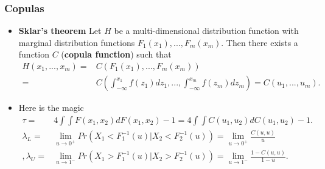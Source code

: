 \documentclass{beamer}
\begin{document}
\begin{frame}
  \frametitle{Copulas}
  \begin{itemize}
  \item \textbf{Sklar's theorem}
    Let $H$ be a multi-dimensional distribution function with marginal
    distribution functions $F_1(x_1),...,F_m(x_m)$. Then there exists a
    function $C$ (\textbf{copula function}) such that
    \begin{equation*}
      \begin{split}
        H(x_1,...,x_m)= & C(F_1(x_1),...,F_m(x_m))\\
        =&C\left(\int_{-\infty}^{x_1}f(z_1)dz_1,...,\int_{-\infty}^{x_m}f(z_m)dz_m\right)=C(u_1,...,u_m).
      \end{split}
    \end{equation*}
\item Here is the magic
  \begin{equation*}
    \label{eq:2}
      \begin{split}
        \tau = & 4 \int \int F(x_1, x_2)dF(x_1,x_2)-1 = 4 \int \int C(u_1, u_2)dC(u_1,u_2)-1. \\
        \lambda_L = & \lim \limits_{u \to 0^{+}} Pr(X_1< F_1^{-1}(u)| X_2<F_2^{-1}(u))= \lim \limits_{u \to 0^{+}} \frac{C(u,u)}{u}\\,
        \lambda_U=&\lim \limits_{u \to 1^{-}} Pr(X_1> F_1^{-1}(u)|
        X_2>F_2^{-1}(u))= \lim \limits_{u \to 1^{-}} \frac{1-C(u,u)}{1-u}.\\
      \end{split}
  \end{equation*}

  \end{itemize}
\end{frame}
\end{document}
